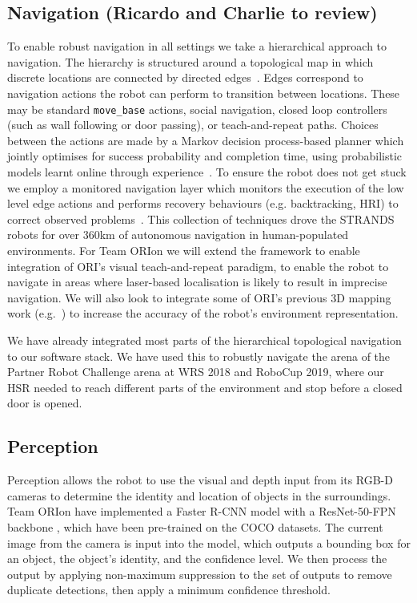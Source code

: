 \documentclass[runningheads,a4paper]{llncs}
\newcommand{\teamori}{Team ORIon}
\begin{document}
\subsection{Navigation (Ricardo and Charlie to review)}

To enable robust navigation in all settings we take a hierarchical approach to navigation. The hierarchy is structured around a topological map in which discrete locations are connected by directed edges~\cite{jpulido2015NowOrLater}. Edges correspond to navigation actions the robot can perform to transition between locations. These may be standard \texttt{move\_base} actions, social navigation, closed loop controllers (such as wall following or door passing), or teach-and-repeat paths. Choices between the actions are made by a Markov decision process-based planner which jointly optimises for success probability and completion time, using probabilistic models learnt online through experience~\cite{lacerda_ijrr19}. To ensure the robot does not get stuck we employ a monitored navigation layer which monitors the execution of the low level edge actions and performs recovery behaviours (e.g. backtracking, HRI) to correct observed problems~\cite{strands@ram}. This collection of techniques drove the STRANDS robots for over 360km of autonomous navigation in human-populated environments. For \teamori{} we will extend the framework to enable integration of ORI's visual teach-and-repeat paradigm, to enable the robot to navigate in areas where laser-based localisation is likely to result in imprecise navigation. We will also look to integrate some of ORI's previous 3D mapping work (e.g.~\cite{AmayoICRA2016}) to increase the accuracy of the robot's environment representation.

We have already integrated most parts of the hierarchical topological navigation
to our software stack. We have used this to robustly navigate the arena of
the Partner Robot Challenge arena at WRS 2018 and RoboCup 2019, where our HSR needed to reach
different parts of the environment and stop before a closed
door is opened.


\subsection{Perception}\label{sec:capability-perception}
Perception allows the robot to use the visual and depth input from its RGB-D cameras to determine the identity and location of objects in the surroundings. \teamori{} have implemented a Faster R-CNN model with a ResNet-50-FPN backbone \cite{ren2016faster}, which have been pre-trained on the COCO datasets. The current image from the camera is input into the model, which outputs a bounding box for an object, the object's identity, and the confidence level. We then process the output by applying non-maximum suppression to the set of outputs to remove duplicate detections, then apply a minimum confidence threshold.
\end{document}
